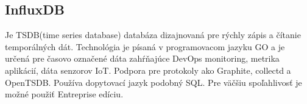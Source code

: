 \documentclass[./main.tex]{subfiles}
\begin{document}
\subsection{InfluxDB}
    Je TSDB(time series database) databáza dizajnovaná pre rýchly zápis a čítanie temporálných dát. Technológia je písaná v programovacom jazyku GO a je určená pre časovo označené dáta zahŕňajúce  DevOps monitoring, metrika aplikácií, dáta senzorov IoT. Podpora pre protokoly ako Graphite, collectd a OpenTSDB. Používa dopytovací jazyk podobný SQL. Pre väčšiu spoľahlivosť je možné použiť Entreprise edíciu.\cite{InfluxDB}
    
    
\end{document}
